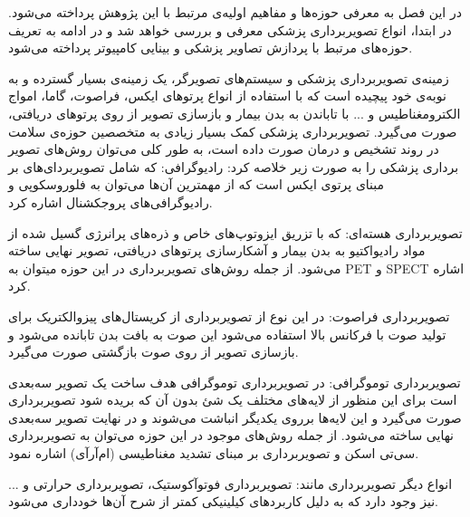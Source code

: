 

در این فصل به معرفی حوزه‌ها و مفاهیم اولیه‌ی مرتبط با این پژوهش پرداخته می‌شود. در ابتدا، انواع تصویربرداری پزشکی معرفی و بررسی خواهد شد و در ادامه به تعریف حوزه‌های مرتبط با پردازش تصاویر پزشکی و بینایی کامپیوتر پرداخته می‌شود.



زمینه‌ی تصویربرداری پزشکی و سیستم‌های تصویرگر، یک زمینه‌ی بسیار گسترده و به نوبه‌ی خود پیچیده است که با استفاده از انواع پرتوهای ایکس، فراصوت، گاما، امواج الکترومغناطیس و ... با تاباندن به بدن بیمار و بازسازی تصویر از روی پرتوهای دریافتی، صورت می‌‌گیرد. تصویربرداری پزشکی کمک بسیار زیادی به متخصصین حوزه‌ی سلامت در روند تشخیص و درمان صورت داده است، به طور کلی می‌توان روش‌های تصویر برداری پزشکی را به صورت زیر خلاصه کرد:‌‌
 رادیوگرافی: که شامل تصویربردای‌های بر مبنای پرتوی ایکس است که از مهمترین آن‌ها می‌توان به فلوروسکوپی و رادیوگرافی‌های پروجکشنال اشاره کرد.

 تصویربرداری هسته‌ای: که با تزریق ایزوتوپ‌های خاص و ذره‌های پرانرژی گسیل شده از مواد رادیواکتیو به بدن بیمار و آشکارسازی پرتوهای دریافتی، تصویر نهایی ساخته می‌شود. از جمله روش‌های تصویربرداری در این حوزه میتوان به PET  و SPECT  اشاره کرد.

 تصویربرداری فراصوت: در این نوع از تصویربرداری از کریستال‌های پیزوالکتریک برای تولید صوت با فرکانس بالا استفاده می‌شود این صوت به بافت بدن تابانده می‌شود و بازسازی تصویر از روی صوت بازگشتی صورت می‌گیرد. 

 تصویربرداری توموگرافی: در تصویربرداری توموگرافی هدف ساخت یک تصویر سه‌بعدی است برای این منظور از لایه‌های مختلف یک شئ بدون آن که بریده شود تصویربرداری صورت می‌گیرد و این لایه‌ها برروی یکدیگر انباشت می‌شوند و در نهایت تصویر سه‌بعدی نهایی ساخته می‌شود. از جمله روش‌های موجود در این حوزه می‌توان به تصویربرداری سی‌تی اسکن و تصویربرداری بر مبنای تشدید مغناطیسی (ام‌آرآی) اشاره نمود.

 انواع دیگر تصویربرداری مانند: تصویربرداری فوتوآکوستیک، تصویربرداری حرارتی و ... نیز وجود دارد که به دلیل کاربردهای کیلینیکی کمتر از شرح آن‌ها خودداری می‌شود.

